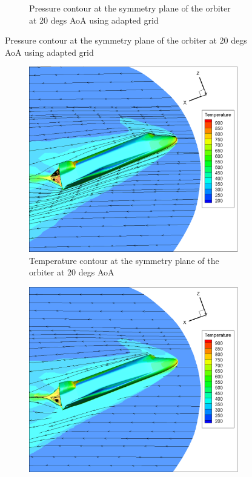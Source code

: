 \begin{figure}[H]
\begin{subfigure}[b]{0.65\textwidth}
		 \caption{Pressure contour at the symmetry plane of the orbiter at 20 degs AoA using adapted grid}
		 \label{fig: 20_adapt_sym_pressure_contour}
    \end{subfigure}
\end{figure}

\begin{figure}[H]

	\centering
    \begin{subfigure}[b]{0.65\textwidth}
         \centering
		 \includegraphics[width=\textwidth]{report_images/20_sym_temp_contour.png}
		 \caption{Temperature contour at the symmetry plane of the orbiter at 20 degs AoA}
		 \label{fig: 20_sym_temp_contour}
    \end{subfigure} 
    \begin{subfigure}[b]{0.65\textwidth}
         \centering
		 \includegraphics[width=\textwidth]{report_images/20_adapted_sym_temp_contour.png}

\end{subfigure}
\end{figure}
